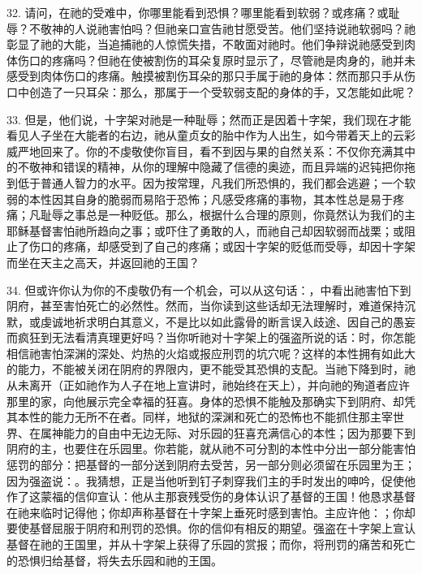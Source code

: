 32. 请问，在祂的受难中，你哪里能看到恐惧？哪里能看到软弱？或疼痛？或耻辱？不敬神的人说祂害怕吗？但祂亲口宣告祂甘愿受苦。他们坚持说祂软弱吗？祂彰显了祂的大能，当追捕祂的人惊慌失措，不敢面对祂时。他们争辩说祂感受到肉体伤口的疼痛吗？但祂在使被割伤的耳朵复原时显示了，尽管祂是肉身的，祂并未感受到肉体伤口的疼痛。触摸被割伤耳朵的那只手属于祂的身体：然而那只手从伤口中创造了一只耳朵：那么，那属于一个受软弱支配的身体的手，又怎能如此呢？\par

33. 但是，他们说，十字架对祂是一种耻辱；然而正是因着十字架，我们现在才能看见人子坐在大能者的右边，祂从童贞女的胎中作为人出生，如今带着天上的云彩威严地回来了。你的不虔敬使你盲目，看不到因与果的自然关系：不仅你充满其中的不敬神和错误的精神，从你的理解中隐藏了信德的奥迹，而且异端的迟钝把你拖到低于普通人智力的水平。因为按常理，凡我们所恐惧的，我们都会逃避；一个软弱的本性因其自身的脆弱而易陷于恐怖；凡感受疼痛的事物，其本性总是易于疼痛；凡耻辱之事总是一种贬低。那么，根据什么合理的原则，你竟然认为我们的主耶稣基督害怕祂所趋向之事；或吓住了勇敢的人，而祂自己却因软弱而战栗；或阻止了伤口的疼痛，却感受到了自己的疼痛；或因十字架的贬低而受辱，却因十字架而坐在天主之高天，并返回祂的王国？\par

34. 但或许你认为你的不虔敬仍有一个机会，可以从这句话：，中看出祂害怕下到阴府，甚至害怕死亡的必然性。然而，当你读到这些话却无法理解时，难道保持沉默，或虔诚地祈求明白其意义，不是比以如此露骨的断言误入歧途、因自己的愚妄而疯狂到无法看清真理更好吗？当你听祂对十字架上的强盗所说的话：时，你怎能相信祂害怕深渊的深处、灼热的火焰或报应刑罚的坑穴呢？这样的本性拥有如此大的能力，不能被关闭在阴府的界限内，更不能受其恐惧的支配。当祂下降到时，祂从未离开（正如祂作为人子在地上宣讲时，祂始终在天上），并向祂的殉道者应许那里的家，向他展示完全幸福的狂喜。身体的恐惧不能触及那确实下到阴府、却凭其本性的能力无所不在者。同样，地狱的深渊和死亡的恐怖也不能抓住那主宰世界、在属神能力的自由中无边无际、对乐园的狂喜充满信心的本性；因为那要下到阴府的主，也要住在乐园里。你若能，就从祂不可分割的本性中分出一部分能害怕惩罚的部分：把基督的一部分送到阴府去受苦，另一部分则必须留在乐园里为王；因为强盗说：。我猜想，正是当他听到钉子刺穿我们主的手时发出的呻吟，促使他作了这蒙福的信仰宣认：他从主那衰残受伤的身体认识了基督的王国！他恳求基督在祂来临时记得他；你却声称基督在十字架上垂死时感到害怕。主应许他：；你却要使基督屈服于阴府和刑罚的恐惧。你的信仰有相反的期望。强盗在十字架上宣认基督在祂的王国里，并从十字架上获得了乐园的赏报；而你，将刑罚的痛苦和死亡的恐惧归给基督，将失去乐园和祂的王国。\par

